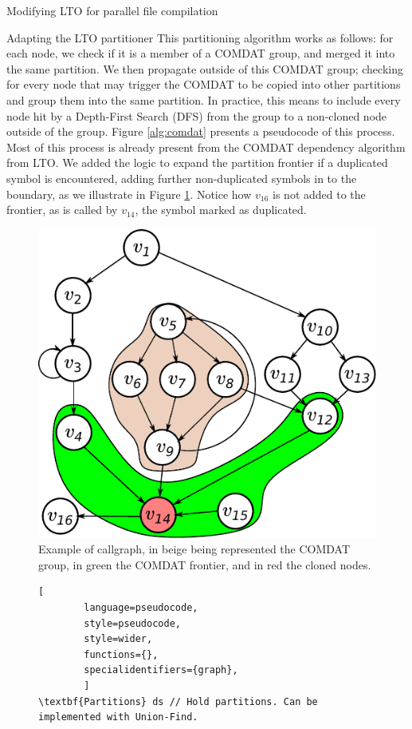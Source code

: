\begin{section}{Modifying LTO for parallel file compilation}
\begin{subsection}{Adapting the LTO partitioner}
This partitioning algorithm works as follows: for each node, we check if it is
a member of a COMDAT \cite{comdat} group, and merged it into the same
partition. We then propagate outside of this COMDAT group; checking for every
node that may trigger the COMDAT to be copied into other partitions and group
them into the same partition. In practice, this means to include every node hit
by a Depth-First Search (DFS) from the group to a non-cloned node outside of
the group.  Figure \ref{alg:comdat} presents a pseudocode of this process.
Most of this process is already present from the COMDAT dependency algorithm
from LTO.  We added the logic to expand the partition frontier if a duplicated
symbol is encountered, adding further non-duplicated symbols in to
the boundary, as we illustrate in Figure \ref{fig:comdat_frontier}. Notice how
$v_{16}$ is not added to the frontier, as is called by $v_{14}$, the symbol marked
as duplicated.

\begin{figure}
\centering
	 \includegraphics[scale=0.7]{figuras/comdat_frontier.pdf}
	  \caption{Example of callgraph, in beige being represented the COMDAT group,
	  in green the COMDAT frontier, and in red the cloned nodes.}
	  \label{fig:comdat_frontier}
\end{figure}


\begin{figure}[ht]
	\begin{center}
	\begin{lstlisting}[
		language=pseudocode,
		style=pseudocode,
		style=wider,
		functions={},
		specialidentifiers={graph},
		]
\textbf{Partitions} ds // Hold partitions. Can be implemented with Union-Find.


\end{lstlisting}
\end{center}
\end{figure}
\end{subsection}
\end{section}
